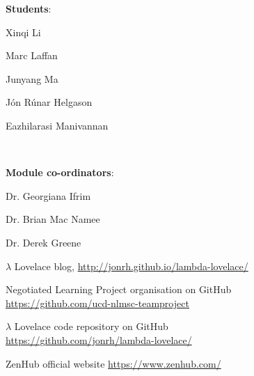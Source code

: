 \documentclass{article}
\begin{document}
\begin{samepage}
\begin{center}
\begin{minipage}[t]{.4\textwidth}
	\textbf{Students}:
		\begin{itemize*}
			\item Xinqi Li
			\item Marc Laffan
			\item Junyang Ma
			\item Jón Rúnar Helgason
			\item Eazhilarasi Manivannan
		\end{itemize*}
\end{minipage}
~
\begin{minipage}[t]{.4\textwidth}
	\textbf{Module co-ordinators}:
	\begin{itemize*}
		\item Dr. Georgiana Ifrim
		\item Dr. Brian Mac Namee
		\item Dr. Derek Greene
	\end{itemize*}
\end{minipage}
\end{center}
\end{samepage}

\vspace{0.5em}

\begin{thebibliography}{9} 

	$\lambda$ Lovelace blog, \url{http://jonrh.github.io/lambda-lovelace/}
	
	Negotiated Learning Project organisation on GitHub \\
	\url{https://github.com/ucd-nlmsc-teamproject}

	$\lambda$ Lovelace code repository on GitHub \\
	\url{https://github.com/jonrh/lambda-lovelace/}
	
	ZenHub official website \url{https://www.zenhub.com/}


\end{thebibliography}
\end{document}
